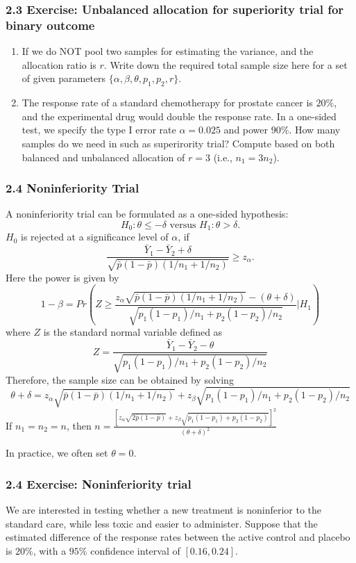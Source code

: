 \documentclass[table,10pt]{beamer}
\begin{document}
\begin{CJK*}{UTF8}{gbsn}
\begin{frame}[t]
\frametitle{2.3 Exercise: Unbalanced allocation for superiority trial for binary outcome}
\begin{enumerate}[(1)]
	\item If we do NOT pool two samples for estimating the variance, and the allocation 
		ratio is $r$. Write down the required total sample size here for a set of 
		given parameters $\{\alpha, \beta, \theta, p_1, p_2, r\}$.
	\item The response rate of a standard chemotherapy for prostate cancer is $20\%$, and 
		the experimental drug would double the response rate. In a one-sided test, we 
		specify the type I error rate $\alpha=0.025$ and power $90\%$. How many samples 
		do we need in such as superirority trial? Compute based on both balanced and 
		unbalanced allocation of $r=3$ (i.e., $n_1 = 3n_2$).
\end{enumerate}
\end{frame}


\begin{frame}[t]
\frametitle{2.4 Noninferiority Trial}
A noninferiority trial can be formulated as a one-sided hypothesis:
$$
H_0: \theta \le -\delta \mbox{ versus } H_1: \theta > \delta.
$$
$H_0$ is rejected at a significance level of $\alpha$, if
$$
\frac{\bar{Y}_1 - \bar{Y}_2 + \delta}{\sqrt{\bar{p}(1-\bar{p})(1/n_1+1/n_2)}} \ge z_{\alpha}.
$$
Here the power is given by
$$
1-\beta = Pr \left( Z \ge \frac{z_{\alpha} \sqrt{\bar{p}(1-\bar{p})(1/n_1 + 1/n_2)} - (\theta+\delta)}{\sqrt{p_1(1-p_1)/n_1 + p_2(1-p_2)/n_2}} \big| H_1\right)
$$
where $Z$ is the standard normal variable defined as
$$
Z = \frac{\bar{Y}_1 - \bar{Y}_2 - \theta}{\sqrt{p_1(1-p_1)/n_1 + p_2(1-p_2)/n_2}}
$$
Therefore, the sample size can be obtained by solving
$$
\theta + \delta = z_{\alpha} \sqrt{\bar{p}(1-\bar{p})(1/n_1+1/n_2)} + z_{\beta} \sqrt{p_1(1-p_1)/n_1 + p_2(1-p_2)/n_2}
$$
If $n_1 = n_2 = n$, then $
n = \frac{\left[ z_{\alpha} \sqrt{2\bar{p}(1-\bar{p})} + z_{\beta} \sqrt{p_1(1-p_1) + p_2(1-p_2)}\right]^2}{(\theta + \delta)^2}
$

In practice, we often set $\theta = 0$.
\end{frame}


\begin{frame}[t]
\frametitle{2.4 Exercise: Noninferiority trial}
We are interested in testing whether a new treatment is noninferior to 
the standard care, while less toxic and easier to administer. Suppose 
that the estimated difference of the response rates between the active 
control and placebo is $20\%$, with a $95\%$ confidence interval of 
$[0.16, 0.24]$.


\end{frame}
\end{CJK*}
\end{document}
